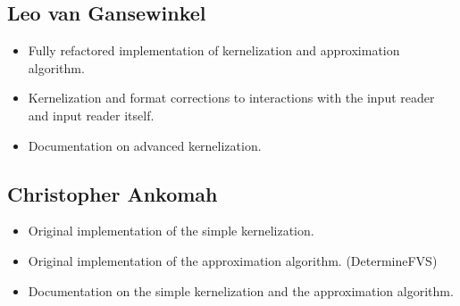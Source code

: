 \subsection{Leo van Gansewinkel}
\begin{itemize}
 \item Fully refactored implementation of kernelization and approximation algorithm.
 \item Kernelization and format corrections to interactions with the input reader and input reader itself.
 \item Documentation on advanced kernelization.
\end{itemize}

\subsection{Christopher Ankomah}
\begin{itemize}
 \item Original implementation of the simple kernelization.
 \item Original implementation of the approximation algorithm. (DetermineFVS)
 \item Documentation on the simple kernelization and the approximation algorithm.
\end{itemize}

